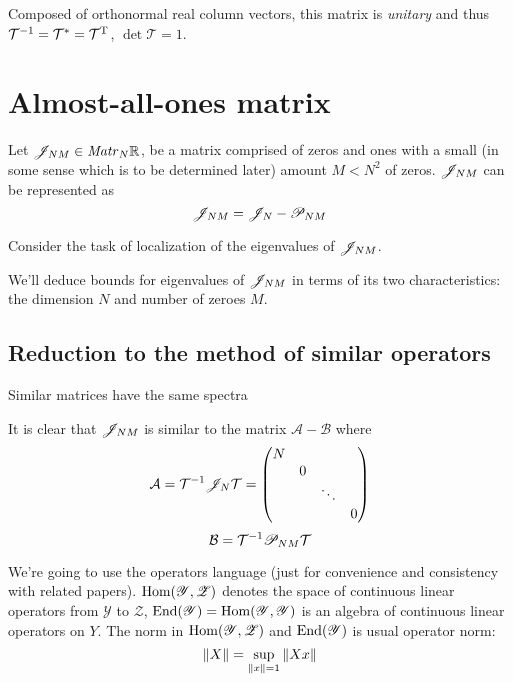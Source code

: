\documentclass{article}
\begin{document}
\begin{propose}
    Composed of orthonormal real column vectors, this matrix is \emph{unitary}
    and thus $\mathcal T^{-1} = \mathcal T^{\mathrm{*}} = \mathcal T^{\mathrm{T}}$,
    $\det\mathcal T = 1$.
\end{propose}


\section{Almost-all-ones matrix}
Let $\mathscr{J}_{{N}{M}}\in\mathit{Matr}_{N} {\mathbb{R}}$, be a matrix comprised of zeros and ones
with a small (in some sense which is to be determined later) amount $M<N^2$ of zeros.
$\mathscr{J}_{{N}{M}}$ can be represented as
$$\mathscr{J}_{{N}{M}} = \mathscr{J}_{N} - \mathscr{P}_{{N}{M}}$$

Consider the task of localization of the eigenvalues of $\mathscr{J}_{{N}{M}}$.

We'll deduce bounds for eigenvalues of $\mathscr{J}_{{N}{M}}$
in terms of its two characteristics: the dimension $N$ and number of zeroes $M$.

\subsection{Reduction to the method of similar operators}

\begin{propose}
    Similar matrices have the same spectra
\end{propose}

It is clear that $\mathscr{J}_{{N}{M}}$ is similar to the matrix $\mathcal A - \mathcal B$ where
$$\mathcal A = {\mathcal T}^{-1}{\mathscr{J}_{N}}{\mathcal T}
= \begin{pmatrix}
    N &   &        & \\
      & 0 &        & \\
      &   & \ddots & \\
      &   &        & 0
\end{pmatrix}$$
$$\mathcal B = {\mathcal T}^{-1}{\mathscr{P}_{{N}{M}}}{\mathcal T}$$


We're going to use the operators language (just for convenience and consistency with related papers).
$\mathrm{Hom}({\mathscr Y},{\mathscr Z})$ denotes the space of continuous linear operators
from $\mathscr Y$ to $\mathscr Z$,
$\mathrm{End}({\mathscr Y}) = \mathrm{Hom}({\mathscr Y},{\mathscr Y})$ is an algebra of continuous linear operators on $Y$.
The norm in $\mathrm{Hom}({\mathscr Y},{\mathscr Z})$ and $\mathrm{End}({\mathscr Y})$ is usual operator norm:
$$\left\|{X}\right\| = \sup_{\left\|{x}\right\| = 1}{\left\|{X x}\right\|}$$
\end{document}
